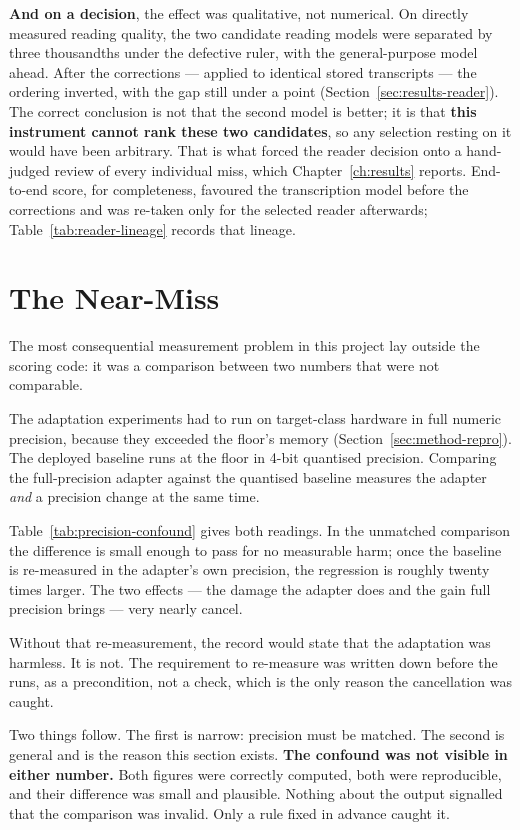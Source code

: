 \textbf{And on a decision}, the effect was qualitative, not numerical. On directly
measured reading quality, the two candidate reading models were separated by three thousandths
under the defective ruler, with the general-purpose model ahead. After the corrections ---
applied to identical stored transcripts --- the ordering inverted, with the gap still under a
point (Section~\ref{sec:results-reader}). The correct conclusion is not that the second model is
better; it is that \textbf{this instrument cannot rank these two candidates}, so any selection
resting on it would have been arbitrary. That is what forced the reader decision onto a
hand-judged review of every individual miss, which Chapter~\ref{ch:results} reports. End-to-end score, for completeness,
favoured the transcription model before the corrections and was re-taken only for the selected
reader afterwards; Table~\ref{tab:reader-lineage} records that lineage.

\section{The Near-Miss}
\label{sec:validity-confound}

The most consequential measurement problem in this project lay outside the scoring code:
it was a comparison between two numbers that were not comparable.

The adaptation experiments had to run on target-class hardware in full numeric precision,
because they exceeded the floor's memory (Section~\ref{sec:method-repro}). The deployed baseline runs
at the floor in 4-bit quantised precision. Comparing the full-precision adapter against the
quantised baseline measures the adapter \emph{and} a precision change at the same time.

Table~\ref{tab:precision-confound} gives both readings. In the unmatched comparison the
difference is small enough to pass for no measurable harm; once the baseline is re-measured in
the adapter's own precision, the regression is roughly twenty times larger. The two effects ---
the damage the adapter does and the gain full precision brings --- very nearly cancel.

Without that re-measurement, the record would state that the adaptation was harmless. It is
not. The requirement to re-measure was written down before the runs, as a
precondition, not a check, which is the only reason the cancellation was caught.

Two things follow. The first is narrow: precision must be matched. The second is general and is
the reason this section exists. \textbf{The confound was not visible in either number.} Both
figures were correctly computed, both were reproducible, and their difference was small and
plausible. Nothing about the output signalled that the comparison was invalid. Only a rule
fixed in advance caught it.

